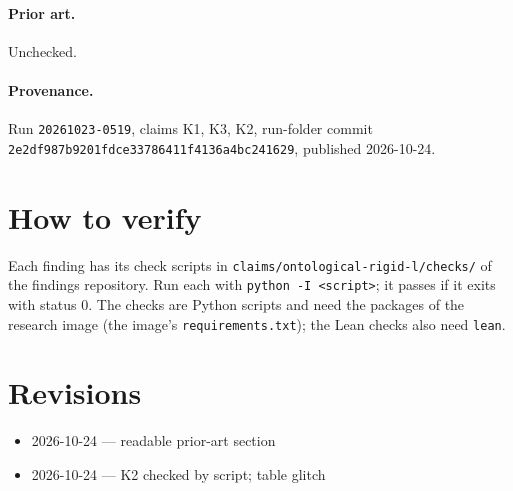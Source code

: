 \documentclass{article}
\begin{document}
\paragraph{Prior art.} Unchecked.

\paragraph{Provenance.}
Run \texttt{20261023-0519}, claims K1, K3, K2, run-folder commit \texttt{2e2df987b9201fdce33786411f4136a4bc241629}, published 2026-10-24.

\section{How to verify}

Each finding has its check scripts in \texttt{claims/ontological-rigid-l/checks/} of the findings repository. Run each with \texttt{python -I <script>}; it passes if it exits with status 0. The checks are Python scripts and need the packages of the research image (the image's \texttt{requirements.txt}); the Lean checks also need \texttt{lean}.

\section{Revisions}

\begin{itemize}
\item 2026-10-24 --- readable prior-art section
\item 2026-10-24 --- K2 checked by script; table glitch
\end{itemize}



\end{document}

